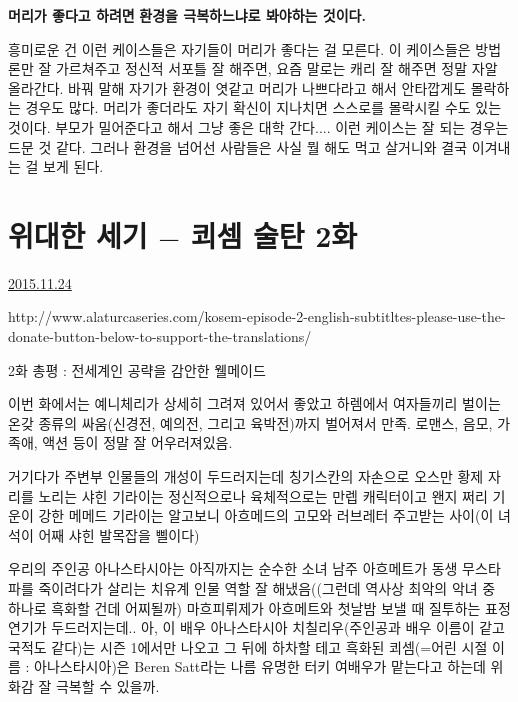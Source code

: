\textbf{머리가 좋다고 하려면}
\textbf{환경을 극복하느냐로 봐야하는 것이다.}

흥미로운 건 이런 케이스들은 자기들이 머리가 좋다는 걸 모른다.
이 케이스들은 방법론만 잘 가르쳐주고 정신적 서포틀 잘 해주면, 요즘 말로는 캐리 잘 해주면 정말 자알 올라간다.
바꿔 말해 자기가 환경이 엿같고 머리가 나쁘다라고 해서 안타깝게도 몰락하는 경우도 많다.
머리가 좋더라도 자기 확신이 지나치면 스스로를 몰락시킬 수도 있는 것이다.
부모가 밀어준다고 해서 그냥 좋은 대학 간다.... 이런 케이스는 잘 되는 경우는 드문 것 같다.    그러나 환경을 넘어선 사람들은 사실 뭘 해도 먹고 살거니와 결국 이겨내는 걸 보게 된다.








\section{위대한 세기 $-$ 쾨셈 술탄 2화}
\href{https://www.kockoc.com/Apoc/508026}{2015.11.24}

\vspace{5mm}

http://www.alaturcaseries.com/kosem-episode-2-english-subtitltes-please-use-the-donate-button-below-to-support-the-translations/
\vspace{5mm}

2화 총평 : 전세계인 공략을 감안한 웰메이드
\vspace{5mm}

이번 화에서는 예니체리가 상세히 그려져 있어서 좋았고
하렘에서 여자들끼리 벌이는 온갖 종류의 싸움(신경전, 예의전, 그리고 육박전)까지 벌어져서 만족.
로맨스, 음모, 가족애, 액션 등이 정말 잘 어우러져있음.
\vspace{5mm}

거기다가 주변부 인물들의 개성이 두드러지는데
칭기스칸의 자손으로 오스만 황제 자리를 노리는 샤힌 기라이는 정신적으로나 육체적으로는 만렙 캐릭터이고
왠지 쩌리 기운이 강한 메메드 기라이는 알고보니 아흐메드의 고모와 러브레터 주고받는 사이(이 녀석이 어째 샤힌 발목잡을 삘이다)
\vspace{5mm}

우리의 주인공 아나스타시아는 아직까지는 순수한 소녀
남주 아흐메트가 동생 무스타파를 죽이려다가 살리는 치유계 인물 역할 잘 해냈음((그런데 역사상 최악의 악녀 중 하나로 흑화할 건데 어찌될까)
마흐피뤼제가 아흐메트와 첫날밤 보낼 때 질투하는 표정 연기가 두드러지는데..
아, 이 배우 아나스타시아 치칠리우(주인공과 배우 이름이 같고 국적도 같다)는 시즌 1에서만 나오고 그 뒤에 하차할 테고
흑화된 쾨셈(=어린 시절 이름 : 아나스타시아)은 Beren Satt라는 나름 유명한 터키 여배우가 맡는다고 하는데 위화감 잘 극복할 수 있을까.
\vspace{5mm}

